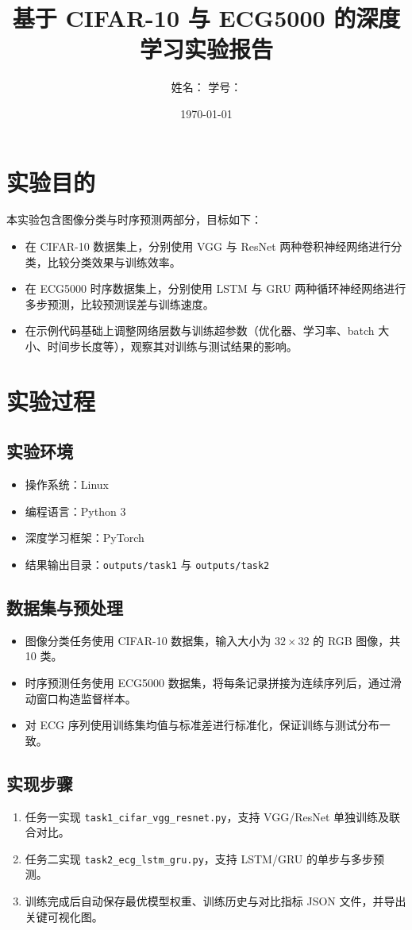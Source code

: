 \documentclass[12pt,a4paper]{ctexart}
\title{基于 CIFAR-10 与 ECG5000 的深度学习实验报告}
\author{姓名：\underline{\hspace{3cm}} \quad 学号：\underline{\hspace{3cm}}}
\date{\today}
\begin{document}
\maketitle

\section{实验目的}
本实验包含图像分类与时序预测两部分，目标如下：
\begin{itemize}
  \item 在 CIFAR-10 数据集上，分别使用 VGG 与 ResNet 两种卷积神经网络进行分类，比较分类效果与训练效率。
  \item 在 ECG5000 时序数据集上，分别使用 LSTM 与 GRU 两种循环神经网络进行多步预测，比较预测误差与训练速度。
  \item 在示例代码基础上调整网络层数与训练超参数（优化器、学习率、batch 大小、时间步长度等），观察其对训练与测试结果的影响。
\end{itemize}

\section{实验过程}
\subsection{实验环境}
\begin{itemize}
  \item 操作系统：Linux
  \item 编程语言：Python 3
  \item 深度学习框架：PyTorch
  \item 结果输出目录：\texttt{outputs/task1} 与 \texttt{outputs/task2}
\end{itemize}

\subsection{数据集与预处理}
\begin{itemize}
  \item 图像分类任务使用 CIFAR-10 数据集，输入大小为 $32\times 32$ 的 RGB 图像，共 10 类。
  \item 时序预测任务使用 ECG5000 数据集，将每条记录拼接为连续序列后，通过滑动窗口构造监督样本。
  \item 对 ECG 序列使用训练集均值与标准差进行标准化，保证训练与测试分布一致。
\end{itemize}

\subsection{实现步骤}
\begin{enumerate}
  \item 任务一实现 \texttt{task1\_cifar\_vgg\_resnet.py}，支持 VGG/ResNet 单独训练及联合对比。
  \item 任务二实现 \texttt{task2\_ecg\_lstm\_gru.py}，支持 LSTM/GRU 的单步与多步预测。
  \item 训练完成后自动保存最优模型权重、训练历史与对比指标 JSON 文件，并导出关键可视化图。
\end{enumerate}
\end{document}
